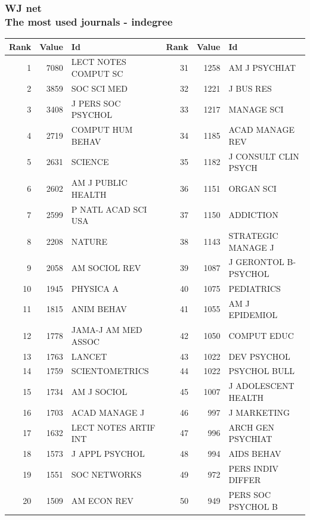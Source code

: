 \documentclass[hyperref={pdfstartview={FitBH -32768},
                         pdfpagemode=FullScreen,
                         plainpages=false,
                         colorlinks=true}
              ]{beamer}
\begin{document}
\begin{frame}[fragile]
\frametitle{WJ net \\ \normalsize The most used journals - indegree}

\renewcommand{\arraystretch}{0.82}
\tiny
\begin{tabular}{r|r|l||r|r|l}
Rank&   	Value&   	Id&   	Rank&   	Value&   	Id \\ \hline
1&   	7080&   	LECT NOTES COMPUT SC&   	31&   	1258&   	AM J PSYCHIAT\\   
2&   	3859&   	SOC SCI MED&   	32&   	1221&   	J BUS RES\\   
3&   	3408&   	J PERS SOC PSYCHOL&   	33&   	1217&   	MANAGE SCI\\   
4&   	2719&   	COMPUT HUM BEHAV&   	34&   	1185&   	ACAD MANAGE REV\\   
5&   	2631&   	SCIENCE&   	35&   	1182&   	J CONSULT CLIN PSYCH\\   
6&   	2602&   	AM J PUBLIC HEALTH&   	36&   	1151&   	ORGAN SCI\\   
7&   	2599&   	P NATL ACAD SCI USA&   	37&   	1150&   	ADDICTION\\   
8&   	2208&   	NATURE&   	38&   	1143&   	STRATEGIC MANAGE J\\   
9&   	2058&   	AM SOCIOL REV&   	39&   	1087&   	J GERONTOL B-PSYCHOL\\   
10&   	1945&   	PHYSICA A&   	40&   	1075&   	PEDIATRICS\\   
11&   	1815&   	ANIM BEHAV&   	41&   	1055&   	AM J EPIDEMIOL\\   
12&   	1778&   	JAMA-J AM MED ASSOC&   	42&   	1050&   	COMPUT EDUC\\   
13&   	1763&   	LANCET&   	43&   	1022&   	DEV PSYCHOL\\   
14&   	1759&   	SCIENTOMETRICS&   	44&   	1022&   	PSYCHOL BULL\\   
15&   	1734&   	AM J SOCIOL&   	45&   	1007&   	J ADOLESCENT HEALTH\\   
16&   	1703&   	ACAD MANAGE J&   	46&   	997&   	J MARKETING\\   
17&   	1632&   	LECT NOTES ARTIF INT&   	47&   	996&   	ARCH GEN PSYCHIAT\\   
18&   	1573&   	J APPL PSYCHOL&   	48&   	994&   	AIDS BEHAV\\   
19&   	1551&   	SOC NETWORKS&   	49&   	972&   	PERS INDIV DIFFER\\   
20&   	1509&   	AM ECON REV&   	50&   	949&   	PERS SOC PSYCHOL B\\   

\end{tabular}
\end{frame}
\end{document}
